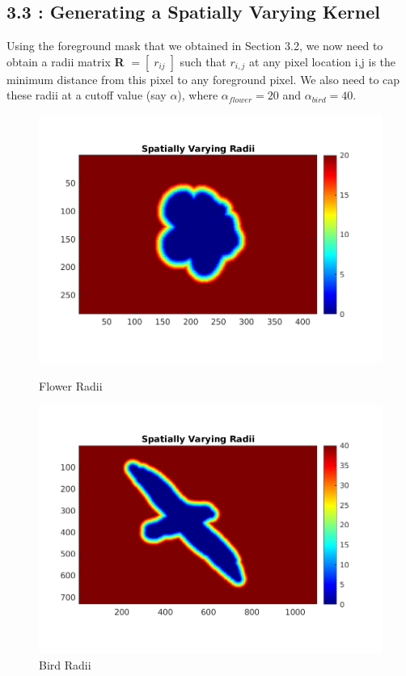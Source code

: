 \documentclass[12pt, a4paper]{article}
\begin{document}
\subsection*{3.3 : Generating a Spatially Varying Kernel}
\quad\quad Using the foreground mask that we obtained in Section 3.2, we now need to obtain a radii matrix \textbf{R} $= [\;r_{ij}\;]$ such that $r_{i,j}$ at any pixel location i,j is the minimum distance from this pixel to any foreground pixel. We also need to cap these radii at a cutoff value (say $\alpha$), where $\alpha_{flower} = 20$ and $\alpha_{bird} = 40$. 
\vspace*{-15pt}
\begin{figure}[h!]
    \centering
    \renewcommand{\thefigure}{3.3(a)}
    \begin{minipage}[c][1\width]{0.45\textwidth}
    	\hspace*{-0.5in}
    	\includegraphics[width=1.24\textwidth]{flower_radii.png}
    	\null\vspace*{-28pt}
    	\caption{Flower Radii}
	    \label{fig:3.3(a)}
    \end{minipage}
        \renewcommand{\thefigure}{3.3(b)}
    \begin{minipage}[c][1\width]{0.45\textwidth}
    	\includegraphics[width=1.24\textwidth]{bird_radii.png}
    	\null\vspace*{-28pt}
    	\caption{Bird Radii}
	    \label{fig:3.3(b)}
    \end{minipage}
\end{figure}
\end{document}
